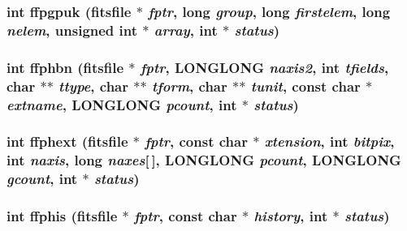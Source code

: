 \subsubsection{\setlength{\rightskip}{0pt plus 5cm}int ffpgpuk (\bf{fitsfile} $\ast$ {\em fptr}, long {\em group}, long {\em firstelem}, long {\em nelem}, unsigned int $\ast$ {\em array}, int $\ast$ {\em status})}\label{test_2shm__client_2fitsio_8h_c2f5e0ecd6a8e45255cf730ab2a15f09}


\subsubsection{\setlength{\rightskip}{0pt plus 5cm}int ffphbn (\bf{fitsfile} $\ast$ {\em fptr}, \bf{LONGLONG} {\em naxis2}, int {\em tfields}, char $\ast$$\ast$ {\em ttype}, char $\ast$$\ast$ {\em tform}, char $\ast$$\ast$ {\em tunit}, const char $\ast$ {\em extname}, \bf{LONGLONG} {\em pcount}, int $\ast$ {\em status})}\label{test_2shm__client_2fitsio_8h_a8f74cde55dda30752adf41a2dc20af4}


\subsubsection{\setlength{\rightskip}{0pt plus 5cm}int ffphext (\bf{fitsfile} $\ast$ {\em fptr}, const char $\ast$ {\em xtension}, int {\em bitpix}, int {\em naxis}, long {\em naxes}[$\,$], \bf{LONGLONG} {\em pcount}, \bf{LONGLONG} {\em gcount}, int $\ast$ {\em status})}\label{test_2shm__client_2fitsio_8h_f27450c869fa355247522a3769bd1013}


\subsubsection{\setlength{\rightskip}{0pt plus 5cm}int ffphis (\bf{fitsfile} $\ast$ {\em fptr}, const char $\ast$ {\em history}, int $\ast$ {\em status})}\label{test_2shm__client_2fitsio_8h_2634330d947ba82006719202dac74b14}


